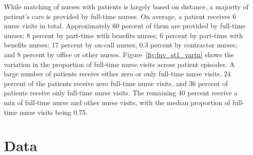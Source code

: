 \documentclass[final,12pt]{article}
\begin{document}
While matching of nurses with patients is largely based on distance, a majority of patient's care is provided by full-time nurses. On average, a patient receives 6 nurse visits in total. Approximately 60 percent of them are provided by full-time nurses; 8 percent by part-time with benefits nurses; 6 percent by part-time with benefits nurses; 17 percent by on-call nurses; 0.3 percent by contractor nurses; and 8 percent by office or other nurses.
Figure~\ref{fig:fnv_st1_vartn} shows the variation in the proportion of full-time nurse visits across patient episodes. A large number of patients receive either zero or only full-time nurse visits. 24 percent of the patients receive zero full-time nurse visits, and 36 percent of patients receive only full-time nurse visits. The remaining 40 percent receive a mix of full-time nurse and other nurse visits, with the median proportion of full-time nurse visits being 0.75.

%





\section{Data} \label{sec:data_ch1}
\end{document}
